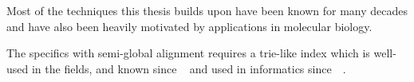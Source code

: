 Most of the techniques this thesis builds upon have been known for many decades
and have also been heavily motivated by applications in molecular biology. 

The specifics with semi-global alignment requires a trie-like index which is
well-used in the fields, and known since
\citeyear{thue1912gegenseitige}~\cite{thue1912gegenseitige} and used in
informatics since~\citeyear{de1959file}~\cite{de1959file}.